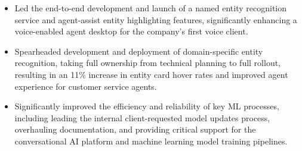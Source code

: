 \documentclass[10pt,letterpaper]{article}
\begin{document}
{\begin{itemize}[leftmargin=*, nosep]
\begin{itemize}[leftmargin=*, nosep]
    \item Led the end-to-end development and launch of a named entity recognition service and agent-assist entity highlighting features, significantly enhancing a voice-enabled agent desktop for the company's first voice client.
    \item Spearheaded development and deployment of domain-specific entity recognition, taking full ownership from technical planning to full rollout, resulting in an 11\% increase in entity card hover rates and improved agent experience for customer service agents.
    \item Significantly improved the efficiency and reliability of key ML processes, including leading the internal client-requested model updates process, overhauling documentation, and providing critical support for the conversational AI platform and machine learning model training pipelines.
  \end{itemize}
\end{itemize}
}

\vspace{0.3em}
\end{document}
